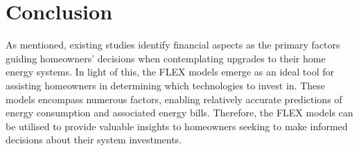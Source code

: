 \section{Conclusion}

As mentioned, existing studies identify financial aspects as the primary factors guiding homeowners' decisions when contemplating upgrades to their home energy systems. 
In light of this, the FLEX models emerge as an ideal tool for assisting homeowners in determining which technologies to invest in. 
These models encompass numerous factors, enabling relatively accurate predictions of energy consumption and associated energy bills. 
Therefore, the FLEX models can be utilised to provide valuable insights to homeowners seeking to make informed decisions about their system investments. 
